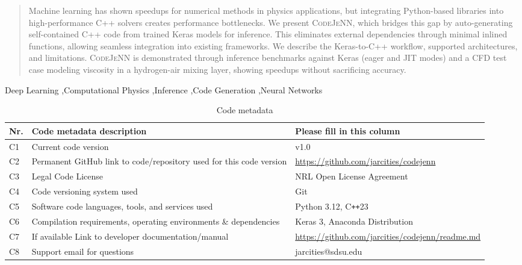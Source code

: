 \documentclass[preprint,12pt, a4paper]{elsarticle}
\begin{document}
\begin{frontmatter}
\begin{abstract}
Machine learning has shown speedups for numerical methods in physics applications, but integrating Python-based libraries into high-performance C++ solvers creates performance bottlenecks. We present \textsc{CodeJeNN}, which bridges this gap by auto-generating self-contained C++ code from trained Keras models for inference. This eliminates external dependencies through minimal inlined functions, allowing seamless integration into existing frameworks. We describe the Keras-to-C++ workflow, supported architectures, and limitations. \textsc{CodeJeNN} is demonstrated through inference benchmarks against Keras (eager and JIT modes) and a CFD test case modeling viscosity in a hydrogen-air mixing layer, showing speedups without sacrificing accuracy.
\end{abstract}

\begin{keyword}
Deep Learning \sep Computational Physics \sep Inference \sep Code Generation \sep Neural Networks

\end{keyword}

\end{frontmatter}


\begin{table}[!h]
\begin{tabular}{|l|p{6.5cm}|p{6.5cm}|}
\hline
\textbf{Nr.} & \textbf{Code metadata description} & \textbf{Please fill in this column} \\
\hline
C1 & Current code version & v1.0 \\
\hline
C2 & Permanent GitHub link to code/repository used for this code version & \url{https://github.com/jarcities/codejenn} \\
\hline
C3 & Legal Code License & NRL Open License Agreement \\
\hline
C4 & Code versioning system used & Git \\
\hline
C5 & Software code languages, tools, and services used & Python 3.12, C\texttt{++}23 \\
\hline
C6 & Compilation requirements, operating environments \& dependencies & Keras 3, Anaconda Distribution \\
\hline
C7 & If available Link to developer documentation/manual & \url{https://github.com/jarcities/codejenn/readme.md} \\
\hline
C8 & Support email for questions & jarcities@sdsu.edu \\
\hline
\end{tabular}
\caption{Code metadata}
\label{} 
\end{table}
\end{document}
